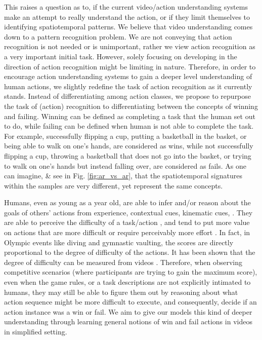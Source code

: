 \documentclass[final]{cvpr}
\begin{document}
This raises a question as to, if the current video/action understanding systems make an attempt to really understand the action, or if they limit themselves to identifying spatiotemporal patterns. We believe that video understanding comes down to a pattern recognition problem. We are not conveying that action recognition is not needed or is unimportant, rather we view action recognition as a very important initial task. However, solely focusing on developing in the direction of action recognition might be limiting in nature. Therefore, in order to encourage action understanding systems to gain a deeper level understanding of human actions, we slightly redefine the task of action recognition as it currently stands. Instead of differentiating among action classes, we propose to repurpose the task of (action) recognition to differentiating between the concepts of winning and failing. Winning can be defined as completing a task that the human set out to do, while failing can be defined when human is not able to complete the task. For example, successfully flipping a cup, putting a basketball in the basket, or being able to walk on one's hands, \etc are considered as wins, while not successfully flipping a cup, throwing a basketball that does not go into the basket, or trying to walk on one's hands but instead falling over, are considered as fails. As one can imagine, \& see in Fig. \ref{fig:ar_vs_ar}, that the spatiotemporal signatures within the samples are very different, yet represent the same concepts. 

Humans, even as young as a year old, are able to infer and/or reason about the goals of others' actions from experience, contextual cues, kinematic cues, \etc \cite{woodward2014mirroring, biro2007infants, sommerville2005pulling, woodward2000twelve, falck2006infants}. They are able to perceive the difficulty of a task/action \cite{fitts1954information, grosjean2007fitts, eskenazi2009role}, and tend to put more value on actions that are more difficult or require perceivably more effort \cite{effortheuristic}. In fact, in Olympic events like diving and gymnastic vaulting, the scores are directly proportional to the degree of difficulty of the actions. It has been shown that the degree of difficulty can be measured from videos \cite{ltsoe, li2018scoringnet}. Therefore, when observing competitive scenarios (where participants are trying to gain the maximum score), even when the game rules, or a task descriptions are not explicitly intimated to humans, they may still be able to figure them out by reasoning about what action sequence might be more difficult to execute, and consequently, decide if an action instance was a win or fail. We aim to give our models this kind of deeper understanding through learning general notions of win and fail actions in videos in simplified setting.
\end{document}

